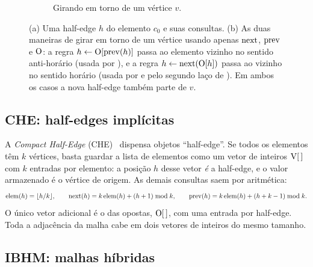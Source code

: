 \begin{figure}[ht]
\begin{subfigure}[b]{0.52\linewidth}
\caption{Girando em torno de um vértice $v$.}
\label{fig:rotacao}
\end{subfigure}
\caption{(a) Uma half-edge $h$ do elemento $c_0$ e suas consultas. (b) As duas maneiras de girar em torno de um vértice
usando apenas $\mathrm{next}$, $\mathrm{prev}$ e $\mathrm{O}$: a regra $h\leftarrow\mathrm{O}[\mathrm{prev}(h)]$ passa ao elemento vizinho no sentido
anti-horário (usada por ), e a regra $h\leftarrow\mathrm{next}(\mathrm{O}[h])$ passa ao vizinho no sentido
horário (usada por  e pelo segundo laço de ). Em ambos os casos a nova half-edge também
parte de $v$.}
\end{figure}

\subsection{CHE: half-edges implícitas}

A \emph{Compact Half-Edge} (CHE)~\cite{che} dispensa objetos ``half-edge''. Se todos os elementos têm $k$ vértices,
basta guardar a lista de elementos como um vetor de inteiros $\mathrm{V}[\,]$ com $k$ entradas por elemento: a posição $h$ desse
vetor \emph{é} a half-edge, e o valor armazenado é o vértice de origem. As demais consultas saem por aritmética:
\[
  \mathrm{elem}(h)=\lfloor h/k\rfloor,\qquad
  \mathrm{next}(h)=k\,\mathrm{elem}(h)+(h+1)\bmod k,\qquad
  \mathrm{prev}(h)=k\,\mathrm{elem}(h)+(h+k-1)\bmod k .
\]
O único vetor adicional é o das opostas, $\mathrm{O}[\,]$, com uma entrada por half-edge. Toda a adjacência da malha cabe em
dois vetores de inteiros do mesmo tamanho.

\subsection{IBHM: malhas híbridas}

